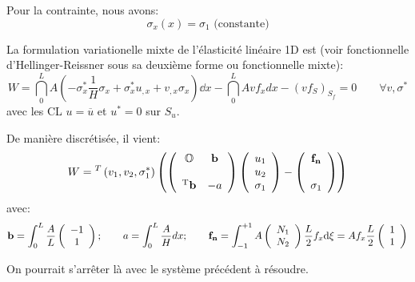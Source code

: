 \medskip
Pour la contrainte, nous avons:
\begin{equation} \sigma_x(x)=\sigma_1 \text{ (constante)} \end{equation}

\medskip
La formulation variationelle mixte de l'élasticité linéaire 1D est (voir fonctionnelle
d'Hellinger-Reissner sous sa deuxième forme ou fonctionnelle mixte):
\begin{equation}
W=\dint_0^L A\left(-\sigma_x^*\frac1H\sigma_x+\sigma_x^*u_{,x}+v_{,x}\sigma_x\right) \dd x
-\dint_0^L Avf_x dx - (v f_S)_{S_f} = 0\qquad \forall v,\sigma^*
\end{equation}
avec les CL $u=\overline{u}$ et $u^*=0$ sur $S_u$.

\medskip
De manière discrétisée, il vient:
\begin{equation}
W = {}^T\left( v_1, v_2, \sigma_1^*\right)\left(
\left( \begin{array}{cc} \mathbb{O} & \mathbf{b}\\ ~\\ {}^\mathrm{T}\mathbf{b} & -a \end{array}\right)
\left( \begin{array}{c} u_1\\u_2\\ \sigma_1 \end{array}\right)
- \left( \begin{array}{c} \mathbf{f_n}\\~\\ \sigma_1 \end{array}\right)
\right)\end{equation}
avec:
\begin{equation}
\mathbf{b}=\displaystyle\int_0^L \frac{A}L \left( \begin{array}{c} -1\\1\end{array}\right); \qquad
a=\displaystyle\int_0^L \frac{A}H dx; \qquad
\mathbf{f_n} = \displaystyle\int_{-1}^{+1} A \left( \begin{array}{c} N_1\\N_2 \end{array}\right) \frac{L}2 f_x \text{d}\xi =
 A f_x \frac{L}2  \left( \begin{array}{c} 1\\1 \end{array}\right)
\end{equation}

\medskip
On pourrait s'arrêter là avec le système précédent à résoudre.

